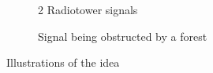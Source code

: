 \begin{figure} [h!]
        \centering
        \begin{subfigure}[b]{0.45\textwidth}
                \caption{2 Radiotower signals}
                \label{fig:tempdgr_1}
        \end{subfigure}
        \begin{subfigure}[b]{0.45\textwidth}
                \caption{Signal being obstructed by a forest}
                \label{fig:tempdgr_2}
        \end{subfigure}
        \caption{Illustrations of the idea}\label{fig:temdgr}
\end{figure}


